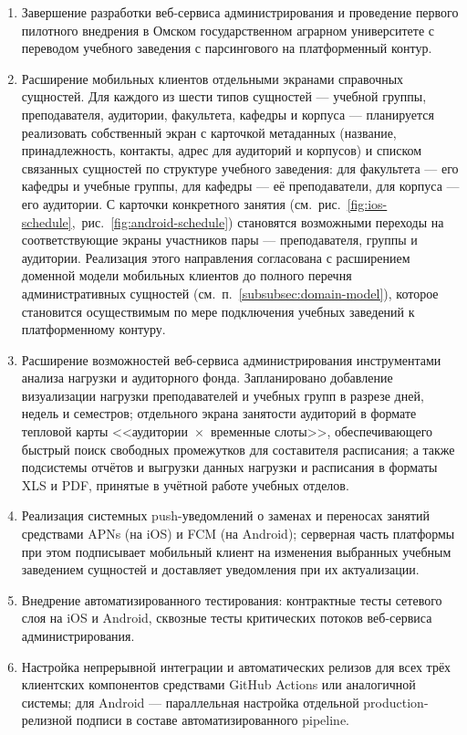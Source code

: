 \begin{enumerate}
  \item Завершение разработки веб-сервиса администрирования и проведение первого пилотного внедрения в Омском государственном аграрном университете с переводом учебного заведения с парсингового на платформенный контур.
  \item Расширение мобильных клиентов отдельными экранами справочных сущностей. Для каждого из шести типов сущностей --- учебной группы, преподавателя, аудитории, факультета, кафедры и корпуса --- планируется реализовать собственный экран с карточкой метаданных (название, принадлежность, контакты, адрес для аудиторий и корпусов) и списком связанных сущностей по структуре учебного заведения: для факультета --- его кафедры и учебные группы, для кафедры --- её преподаватели, для корпуса --- его аудитории. С карточки конкретного занятия (см.~рис.~\ref{fig:ios-schedule},~рис.~\ref{fig:android-schedule}) становятся возможными переходы на соответствующие экраны участников пары --- преподавателя, группы и аудитории. Реализация этого направления согласована с расширением доменной модели мобильных клиентов до полного перечня административных сущностей (см.~п.~\ref{subsubsec:domain-model}), которое становится осуществимым по мере подключения учебных заведений к платформенному контуру.
  \item Расширение возможностей веб-сервиса администрирования инструментами анализа нагрузки и аудиторного фонда. Запланировано добавление визуализации нагрузки преподавателей и учебных групп в разрезе дней, недель и семестров; отдельного экрана занятости аудиторий в формате тепловой карты <<аудитории~$\times$~временные слоты>>, обеспечивающего быстрый поиск свободных промежутков для составителя расписания; а также подсистемы отчётов и выгрузки данных нагрузки и расписания в форматы XLS и PDF, принятые в учётной работе учебных отделов.
  \item Реализация системных push-уведомлений о заменах и переносах занятий средствами APNs (на iOS) и FCM (на Android); серверная часть платформы при этом подписывает мобильный клиент на изменения выбранных учебным заведением сущностей и доставляет уведомления при их актуализации.
  \item Внедрение автоматизированного тестирования: контрактные тесты сетевого слоя на iOS и Android, сквозные тесты критических потоков веб-сервиса администрирования.
  \item Настройка непрерывной интеграции и автоматических релизов для всех трёх клиентских компонентов средствами GitHub Actions или аналогичной системы; для Android --- параллельная настройка отдельной production-релизной подписи в составе автоматизированного pipeline.

\end{enumerate}
